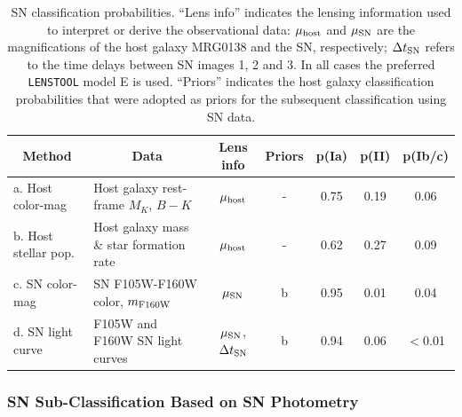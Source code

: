 \documentclass[12pt]{article}
\def\lenstool{{\tt LENSTOOL}\xspace}
\begin{document}
\begin{table}[tb]
    \centering
    \begin{tabular}{lp{1.5in}cc|ccc}
        \multicolumn{1}{c}{Method} & \multicolumn{1}{c}{Data} & Lens info & Priors & p(Ia) & p(II) & p(Ib/c) \\
        \midrule
        a. Host color-mag & Host galaxy rest-frame $M_K$, $B-K$ & $\mu_{\rm host}$ & - & 0.75 & 0.19 & 0.06\\
        b. Host stellar pop. & Host galaxy mass \& star formation rate & $\mu_{\rm host}$ & - & 0.62 & 0.27 & 0.09 \\
        c. SN color-mag & SN F105W-F160W color, $m_{\rm F160W}$ & $\mu_{\rm SN}$ & b & 0.95 & 0.01 & 0.04\\
        d. SN light curve & F105W and F160W SN light curves & $\mu_{\rm SN}$, $\Delta t_{\rm SN}$ & b & 0.94 & 0.06 & $<$0.01 \\
    \end{tabular}
    \caption{SN classification probabilities. ``Lens info'' indicates the lensing information used to interpret or derive the 
    observational data: $\mu_{\rm host}$ and $\mu_{\rm SN}$ are the magnifications of the host galaxy MRG0138 and the SN, respectively; $\Delta t_{\rm SN}$ refers to the time delays between SN images 1, 2 and 3. In all cases the preferred \lenstool model E is used.  ``Priors'' indicates the host galaxy classification probabilities that were adopted as priors for the subsequent classification using SN data.}
    \label{tab:classification}
\end{table}

\subsubsection*{SN Sub-Classification Based on SN Photometry}
\end{document}
